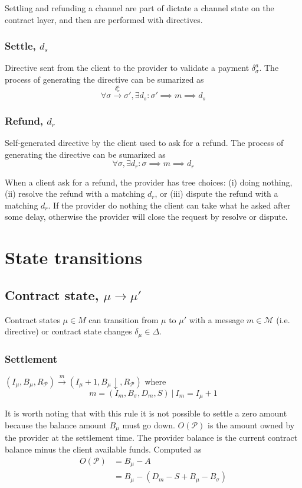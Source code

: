 \documentclass{llncs}
\begin{document}
Settling and refunding a channel are part of dictate a channel state on the contract layer, and then are performed with directives.

\subsubsection{Settle, $d_s$} Directive sent from the client to the provider to validate a payment $\delta_\sigma^a$. The process of generating the directive can be sumarized as
$$\forall \sigma \xrightarrow{\delta_\sigma^a} \sigma', \exists d_s : \sigma' \implies m \implies d_s$$

\subsubsection{Refund, $d_r$} Self-generated directive by the client used to ask for a refund. The process of generating the directive can be sumarized as
$$\forall \sigma, \exists d_r : \sigma \implies m \implies d_r$$

When a client ask for a refund, the provider has tree choices: (i) doing nothing, (ii) resolve the refund with a matching $d_r$, or (iii) dispute the refund with a matching $d_r$. If the provider do nothing the client can take what he asked after some delay, otherwise the provider will close the request by resolve or dispute.

\section{State transitions}

\subsection{Contract state, $\mu \rightarrow \mu'$} Contract states $\mu \in M$ can transition from $\mu$ to $\mu'$ with a message $m \in \mathcal{M}$ (i.e. directive) or contract state changes $\delta_\mu \in \Delta$.

\subsubsection{Settlement} $(I_\mu, B_\mu, R_\mathcal{P}) \xrightarrow{m} (I_\mu+1, B_\mu\downarrow, R_\mathcal{P})$ where
$$m = (I_m, B_\sigma, D_m, S)\ |\ I_m = I_\mu+1$$

It is worth noting that with this rule it is not possible to settle a zero amount because the balance amount $B_\mu$ must go down. $O(\mathcal{P})$ is the amount owned by the provider at the settlement time. The provider balance is the current contract balance minus the client available funds. Computed as
\begin{equation*}
\begin{split}
    O(\mathcal{P}) &= B_\mu - A \\
    &= B_\mu - (D_m - S + B_\mu - B_\sigma) \\
\end{split}
\end{equation*}
\end{document}
